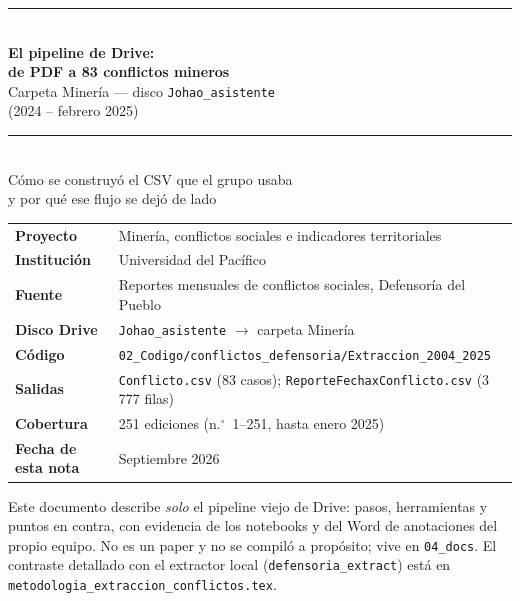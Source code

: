 \documentclass[11pt,a4paper]{article}
\begin{document}
\begin{titlepage}
\centering
\vspace*{1.4cm}
{\color{upnavy}\rule{\textwidth}{1.4pt}}\\[0.7em]
{\LARGE\bfseries\color{upnavy} El pipeline de Drive:}\\[0.35em]
{\LARGE\bfseries\color{upnavy} de PDF a 83 conflictos mineros}\\[0.7em]
{\Large Carpeta Minería --- disco \texttt{Johao\_asistente}\\[0.2em]
(2024 -- febrero 2025)}\\[0.7em]
{\color{upnavy}\rule{\textwidth}{1.4pt}}\\[1.3em]
{\large Cómo se construyó el CSV que el grupo usaba\\[0.2em]
y por qué ese flujo se dejó de lado}\\[2em]

\begin{flushleft}
\renewcommand{\arraystretch}{1.35}
\begin{tabular}{@{}l@{\hspace{1.2em}}l@{}}
\textbf{Proyecto} & Minería, conflictos sociales e indicadores territoriales \\
\textbf{Institución} & Universidad del Pacífico \\
\textbf{Fuente} & Reportes mensuales de conflictos sociales, Defensoría del Pueblo \\
\textbf{Disco Drive} & \texttt{Johao\_asistente} $\rightarrow$ carpeta Minería \\
\textbf{Código} & \texttt{02\_Codigo/conflictos\_defensoria/Extraccion\_2004\_2025} \\
\textbf{Salidas} & \texttt{Conflicto.csv} (83 casos); \texttt{ReporteFechaxConflicto.csv} (3\,777 filas) \\
\textbf{Cobertura} & 251 ediciones (n.$^\circ$~1--251, hasta enero 2025) \\
\textbf{Fecha de esta nota} & Septiembre 2026 \\
\end{tabular}
\end{flushleft}

\vfill
\begin{flushleft}
\color{upgray}\small
Este documento describe \emph{solo} el pipeline viejo de Drive: pasos, herramientas y puntos en contra, con evidencia de los notebooks y del Word de anotaciones del propio equipo. No es un paper y no se compiló a propósito; vive en \texttt{04\_docs}. El contraste detallado con el extractor local (\texttt{defensoria\_extract}) está en \texttt{metodologia\_extraccion\_conflictos.tex}.
\end{flushleft}
\end{titlepage}
\end{document}
